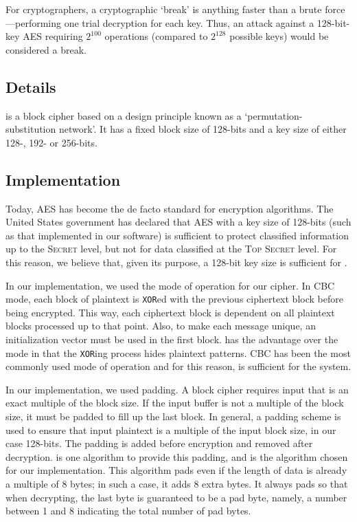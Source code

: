 \documentclass[a4paper,11pt]{article}
\begin{document}
For cryptographers, a cryptographic `break' is anything faster than a brute
force—performing one trial decryption for each key. Thus, an attack against a
128-bit-key AES requiring $2^{100}$ operations (compared to $2^{128}$ possible
keys) would be considered a break.

\subsection{Details}
 is a block cipher based on a design principle known as a
`permutation-substitution network'. It has a fixed block size of 128-bits and a
key size of either 128-, 192- or 256-bits.

\subsection{Implementation}
Today, AES has become the de facto standard for encryption algorithms. The
United States government has declared that AES with a key size of 128-bits (such
as that implemented in our software) is sufficient to protect classified
information up to the \textsc{Secret} level, but not for data classified at the
\textsc{Top Secret} level. For this reason, we believe that, given its
purpose, a 128-bit key size is sufficient for \serviceName{}.

In our implementation, we used the  mode
of operation for our cipher. In CBC mode, each block of plaintext is
\verb+XOR+ed with the previous ciphertext block before being encrypted. This
way, each ciphertext block is dependent on all plaintext blocks processed up to
that point. Also, to make each message unique, an initialization vector must be
used in the first block.  has the advantage over the
 mode in that the \verb+XOR+ing process
hides plaintext patterns. CBC has been the most commonly used mode of operation
and for this reason, is sufficient for the \serviceName{} system.

In our implementation, we used  padding.  A block cipher
requires input that is an exact multiple of the block size. If the input buffer
is not a multiple of the block size, it must be padded to fill up the last
block. In general, a padding scheme is used to ensure that input plaintext is a
multiple of the input block size, in our case 128-bits. The padding is added
before encryption and removed after decryption.  is one
algorithm to provide this padding, and is the algorithm chosen for our
\packageName{} implementation. This algorithm pads even if the length of data is
already a multiple of 8 bytes; in such a case, it adds 8 extra bytes. It always
pads so that when decrypting, the last byte is guaranteed to be a pad byte,
namely, a number between 1 and 8 indicating the total number of pad bytes.
\end{document}
